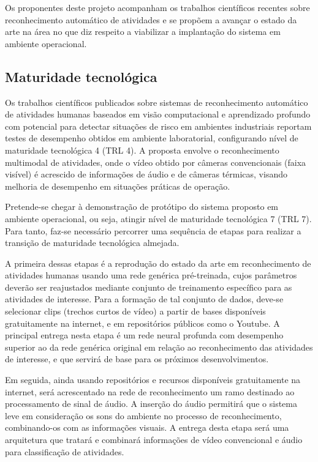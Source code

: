 Os proponentes deste projeto acompanham os trabalhos científicos recentes sobre reconhecimento automático de atividades e se propõem a avançar o estado da arte na área no que diz respeito a viabilizar a implantação do sistema em ambiente operacional.

\subsection{Maturidade tecnológica}
\label{ssec:trl}
Os trabalhos científicos publicados sobre sistemas de reconhecimento automático de atividades humanas baseados em visão computacional e aprendizado profundo com potencial para detectar situações de risco em ambientes industriais reportam testes de desempenho obtidos em ambiente laboratorial, configurando nível de maturidade tecnológica 4 (TRL 4). A proposta envolve o reconhecimento multimodal de atividades, onde o vídeo obtido por câmeras convencionais (faixa visível) é acrescido de informações de áudio e de câmeras térmicas, visando melhoria de desempenho em situações práticas de operação.

Pretende-se chegar à demonstração de protótipo do sistema proposto em ambiente operacional, ou seja, atingir nível de maturidade tecnológica 7 (TRL 7). Para tanto, faz-se necessário percorrer uma sequência de etapas para realizar a transição de maturidade tecnológica almejada.

A primeira dessas etapas é a reprodução do estado da arte em reconhecimento de atividades humanas usando uma rede genérica pré-treinada, cujos parâmetros deverão ser reajustados mediante conjunto de treinamento específico para as atividades de interesse. Para a formação de tal conjunto de dados, deve-se selecionar clips (trechos curtos de vídeo) a partir de bases disponíveis gratuitamente na internet, e em repositórios públicos como o Youtube. A principal entrega nesta etapa é um rede neural profunda com desempenho superior ao da rede genérica original em relação ao reconhecimento das atividades de interesse, e que servirá de base para os próximos desenvolvimentos.

Em seguida, ainda usando repositórios e recursos disponíveis gratuitamente na internet, será acrescentado na rede de reconhecimento um ramo destinado ao processamento de sinal de áudio. A inserção do áudio permitirá que o sistema leve em consideração os sons do ambiente no processo de reconhecimento, combinando-os com as informações visuais. A entrega desta etapa será uma arquitetura que tratará e combinará informações de vídeo convencional e áudio para classificação de atividades. 

